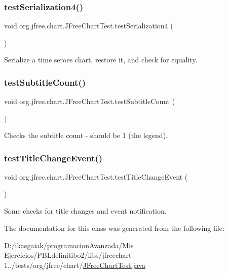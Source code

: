 \subsubsection{\texorpdfstring{test\+Serialization4()}{testSerialization4()}}
{\footnotesize\ttfamily void org.\+jfree.\+chart.\+J\+Free\+Chart\+Test.\+test\+Serialization4 (\begin{DoxyParamCaption}{ }\end{DoxyParamCaption})}

Serialize a time seroes chart, restore it, and check for equality. \mbox{\label{classorg_1_1jfree_1_1chart_1_1_j_free_chart_test_ade1fce7cdb6fe7df4d1d4121b10fea2c}} 
\subsubsection{\texorpdfstring{test\+Subtitle\+Count()}{testSubtitleCount()}}
{\footnotesize\ttfamily void org.\+jfree.\+chart.\+J\+Free\+Chart\+Test.\+test\+Subtitle\+Count (\begin{DoxyParamCaption}{ }\end{DoxyParamCaption})}

Checks the subtitle count -\/ should be 1 (the legend). \mbox{\label{classorg_1_1jfree_1_1chart_1_1_j_free_chart_test_af3e2f90f249efb3cfb3c33a6248e78c9}} 
\subsubsection{\texorpdfstring{test\+Title\+Change\+Event()}{testTitleChangeEvent()}}
{\footnotesize\ttfamily void org.\+jfree.\+chart.\+J\+Free\+Chart\+Test.\+test\+Title\+Change\+Event (\begin{DoxyParamCaption}{ }\end{DoxyParamCaption})}

Some checks for title changes and event notification. 

The documentation for this class was generated from the following file\+:\begin{DoxyCompactItemize}
\item 
D\+:/ikasgaiak/programacion\+Avanzada/\+Mis Ejercicios/\+P\+B\+Ldefinitibo2/libs/jfreechart-\/1../tests/org/jfree/chart/\mbox{\hyperlink{_j_free_chart_test_8java}{J\+Free\+Chart\+Test.\+java}}\end{DoxyCompactItemize}
